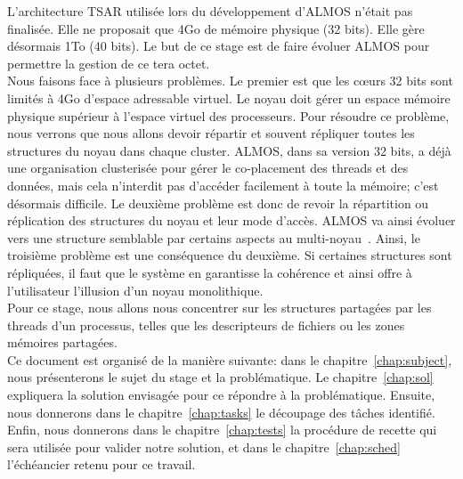   \hspace{1cm}L'architecture TSAR utilisée lors du développement d'ALMOS n'était
  pas finalisée. Elle ne proposait que 4Go de mémoire physique (32 bits). Elle
  gère désormais 1To (40 bits). Le but de ce stage est de faire évoluer ALMOS
  pour permettre la gestion de ce tera octet.\\

  \hspace{1cm}Nous faisons face à plusieurs problèmes. Le premier est que les
  c\oe urs 32 bits sont limités à 4Go d'espace adressable virtuel. Le noyau doit
  gérer un espace mémoire physique supérieur à l'espace virtuel des
  processeurs. Pour résoudre ce problème, nous verrons que nous allons devoir
  répartir et souvent répliquer toutes les structures du noyau dans chaque
  cluster. ALMOS, dans sa version 32 bits, a déjà une organisation clusterisée
  pour gérer le co-placement des threads et des données, mais cela n'interdit
  pas d'accéder facilement à toute la mémoire; c'est désormais difficile. Le
  deuxième problème est donc de revoir la répartition ou réplication des
  structures du noyau et leur mode d'accès. ALMOS va ainsi évoluer vers une
  structure semblable par certains aspects au
  multi-noyau~\citep{baumann2009multikernel}. Ainsi, le troisième problème est
  une conséquence du deuxième. Si certaines structures sont répliquées, il faut
  que le système en garantisse la cohérence et ainsi offre à l'utilisateur
  l'illusion d'un noyau monolithique. \\

  \hspace{1cm}Pour ce stage, nous allons nous concentrer sur les structures
  partagées par les threads d'un processus, telles que les descripteurs de
  fichiers ou les zones mémoires partagées. \\


  \hspace{1cm}Ce document est organisé de la manière suivante: dans le
  chapitre~\ref{chap:subject}, nous présenterons le sujet du stage et la
  problématique. Le chapitre~\ref{chap:sol} expliquera la solution envisagée
  pour ce répondre à la problématique. Ensuite, nous donnerons dans le
  chapitre~\ref{chap:tasks} le découpage des tâches identifié. Enfin, nous
  donnerons dans le chapitre~\ref{chap:tests} la procédure de recette qui sera
  utilisée pour valider notre solution, et dans le chapitre~\ref{chap:sched}
  l'échéancier retenu pour ce travail.
